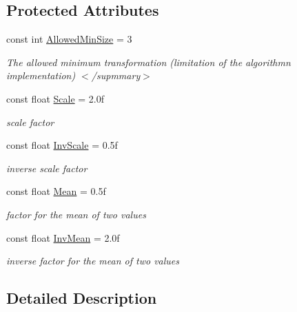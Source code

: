 \subsection*{\-Protected \-Attributes}
\begin{DoxyCompactItemize}
\item 
\hypertarget{class_turbo_wavelets_1_1_haar_wavelet2_d_ae5d11cf5767f2bc0e7326922dc601a8e}{const int \hyperlink{class_turbo_wavelets_1_1_haar_wavelet2_d_ae5d11cf5767f2bc0e7326922dc601a8e}{\-Allowed\-Min\-Size} = 3}\label{class_turbo_wavelets_1_1_haar_wavelet2_d_ae5d11cf5767f2bc0e7326922dc601a8e}

\begin{DoxyCompactList}\small\item\em \-The allowed minimum transformation (limitation of the algorithmn implementation) $<$/supmmary$>$ \end{DoxyCompactList}\item 
const float \hyperlink{class_turbo_wavelets_1_1_haar_wavelet2_d_abb9a814259b4977ed274dde12f878f12}{\-Scale} = 2.\-0f
\begin{DoxyCompactList}\small\item\em scale factor \end{DoxyCompactList}\item 
const float \hyperlink{class_turbo_wavelets_1_1_haar_wavelet2_d_ab2fa94eb968bd48292856758c241b186}{\-Inv\-Scale} = 0.\-5f
\begin{DoxyCompactList}\small\item\em inverse scale factor \end{DoxyCompactList}\item 
const float \hyperlink{class_turbo_wavelets_1_1_haar_wavelet2_d_ae874d9a5f34ead2fbf4dc8efc4fc3e70}{\-Mean} = 0.\-5f
\begin{DoxyCompactList}\small\item\em factor for the mean of two values \end{DoxyCompactList}\item 
const float \hyperlink{class_turbo_wavelets_1_1_haar_wavelet2_d_aea88909dad98e2812d5b065da35ec361}{\-Inv\-Mean} = 2.\-0f
\begin{DoxyCompactList}\small\item\em inverse factor for the mean of two values \end{DoxyCompactList}\end{DoxyCompactItemize}


\subsection{\-Detailed \-Description}


